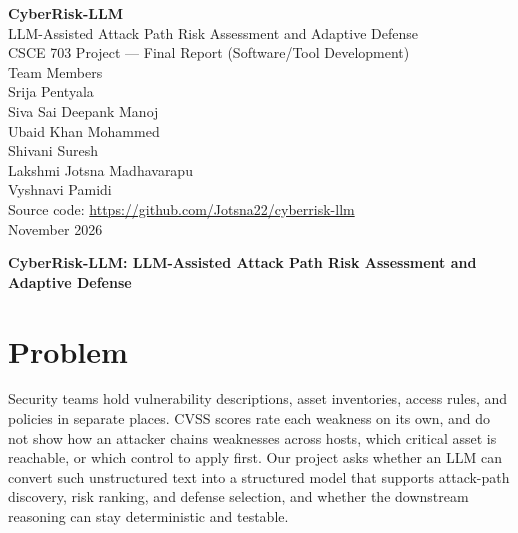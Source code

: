 \documentclass[11pt]{article}
\title{}
\author{}
\date{}
\newcommand{\repourl}{\url{https://github.com/Jotsna22/cyberrisk-llm}}
\begin{document}
\thispagestyle{empty}
\begin{center}
\vspace*{2.5cm}
{\LARGE\bfseries CyberRisk-LLM}\\[0.4cm]
{\Large LLM-Assisted Attack Path Risk Assessment and Adaptive Defense}\\[1.2cm]
{\large CSCE 703 Project --- Final Report (Software/Tool Development)}\\[2cm]
{\large Team Members}\\[0.3cm]
{\normalsize
Srija Pentyala\\
Siva Sai Deepank Manoj\\
Ubaid Khan Mohammed\\
Shivani Suresh\\
Lakshmi Jotsna Madhavarapu\\
Vyshnavi Pamidi}\\[1.5cm]
{\normalsize Source code: \repourl}\\[0.3cm]
{\normalsize November 2026}
\end{center}

\newpage
\setcounter{page}{1}

\begin{center}
{\Large\bfseries CyberRisk-LLM: LLM-Assisted Attack Path Risk Assessment and Adaptive Defense}
\end{center}

\section{Problem}
Security teams hold vulnerability descriptions, asset inventories, access rules, and policies in separate places. CVSS scores rate each weakness on its own, and do not show how an attacker chains weaknesses across hosts, which critical asset is reachable, or which control to apply first. Our project asks whether an LLM can convert such unstructured text into a structured model that supports attack-path discovery, risk ranking, and defense selection, and whether the downstream reasoning can stay deterministic and testable.
\end{document}
